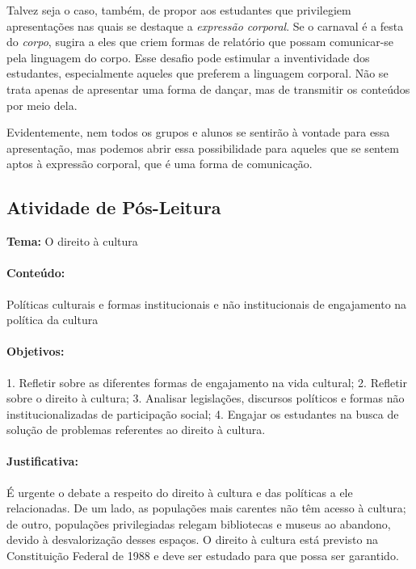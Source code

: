 \documentclass[11pt]{extarticle}
\begin{document}
Talvez seja o caso, também, de propor aos estudantes que privilegiem
apresentações nas quais se destaque a \emph{expressão corporal}. Se o
carnaval é a festa do \emph{corpo}, sugira a eles que criem formas de
relatório que possam comunicar-se pela linguagem do corpo. Esse desafio
pode estimular a inventividade dos estudantes, especialmente aqueles que
preferem a linguagem corporal. Não se trata apenas de apresentar uma
forma de dançar, mas de transmitir os conteúdos por meio dela.

Evidentemente, nem todos os grupos e alunos se sentirão à vontade para
essa apresentação, mas podemos abrir essa possibilidade para aqueles que
se sentem aptos à expressão corporal, que é uma forma de comunicação.

\subsection{Atividade de Pós-Leitura}


\textbf{Tema:} O direito à cultura

\paragraph{Conteúdo:} Políticas culturais e formas institucionais e não
institucionais de engajamento na política da cultura

\paragraph{Objetivos:} 1. Refletir sobre as diferentes formas de
engajamento na vida cultural; 2. Refletir sobre o direito à cultura; 3.
Analisar legislações, discursos políticos e formas não
institucionalizadas de participação social; 4. Engajar os estudantes na
busca de solução de problemas referentes ao direito à cultura.

\paragraph{Justificativa:} É urgente o debate a respeito do direito à
cultura e das políticas a ele relacionadas. De um lado, as populações
mais carentes não têm acesso à cultura; de outro, populações
privilegiadas relegam bibliotecas e museus ao abandono, devido à
desvalorização desses espaços. O direito à cultura está previsto na
Constituição Federal de 1988 e deve ser estudado para que possa ser
garantido.
\end{document}

